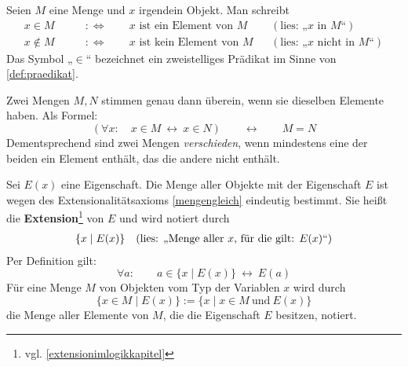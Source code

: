 \begin{nota}[Elementzeichen]
    Seien $M$ eine Menge und $x$ irgendein Objekt. Man schreibt
    \begin{align*}
        x  \in M \qquad&:\Leftrightarrow\qquad \text{$x$ ist ein Element von $M$} && (\text{lies: „$x$ in $M$“})\\
        x\notin M \qquad &:\Leftrightarrow\qquad \text{$x$ ist kein Element von $M$} && (\text{lies: „$x$ nicht in $M$“})
    \end{align*}
    Das Symbol „$\in$“ bezeichnet ein zweistelliges Prädikat im Sinne von \cref{def:praedikat}.
\end{nota}


\begin{axiom}[Extensionalitätsaxiom] \label{mengengleich} 
    Zwei Mengen $M,N$ stimmen genau dann überein, wenn sie dieselben Elemente haben. Als Formel:
        \[ (\forall x:\quad x\in M\ \leftrightarrow\ x\in N)\qquad\leftrightarrow\qquad M=N\]
    Dementsprechend sind zwei Mengen \emph{verschieden}, wenn mindestens eine der beiden ein Element enthält, das die andere nicht enthält.
\end{axiom}


\begin{de} \label{def:extension} 
    Sei $E(x)$ eine Eigenschaft. Die Menge aller Objekte mit der Eigenschaft $E$ ist wegen des Extensionalitätsaxioms \cref{mengengleich} eindeutig bestimmt. Sie heißt die \textbf{Extension}\footnote{vgl. \cref{extensionimlogikkapitel}} von $E$ und wird notiert durch
    \begin{align*}
        \{ x\mid E(x) \} && (\textnormal{lies: „Menge aller $x$, für die gilt: $E(x)$“})
    \end{align*}
    Per Definition gilt:
        \[ \forall a:\qquad a\in \{x\mid E(x)\} \ \leftrightarrow\ E(a) \]
    Für eine Menge $M$ von Objekten vom Typ der Variablen $x$ wird durch
        \[ \{ x\in M\mid E(x) \} := \{ x\mid x\in M\ \text{und}\ E(x)\} \]
    die Menge aller Elemente von $M$, die die Eigenschaft $E$ besitzen, notiert.
\end{de}


